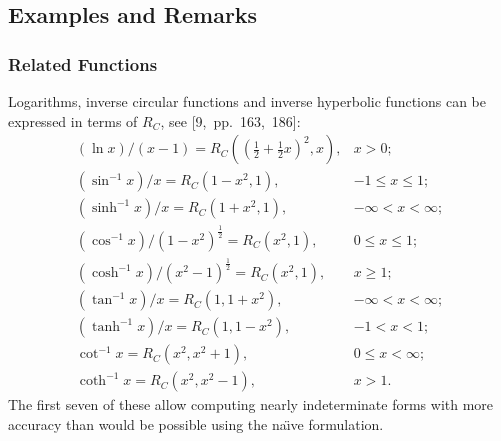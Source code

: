 \documentclass[twoside]{MATH77}
\begin{document}
\subsection{Examples and Remarks}

\subsubsection{Related Functions}

Logarithms, inverse circular functions and inverse hyperbolic functions can
be expressed in terms of $R_C$, see [9,~pp.~163,~186]:
$$
\begin{array}{ll}
(\ln x)/(x-1) = R_C((\frac{1}{2}+\frac{1}{2}x)^2,x), & x>0;\\
(\sin ^{-1} x)/x = R_C(1-x^2,1), & -1\leq x\leq 1;\\
(\sinh^{-1} x)/x = R_C(1+x^2,1),& -\infty <x<\infty;\\
(\cos ^{-1} x)/(1-x^2)^{\frac{1}{2}} = R_C(x^2,1), & 0\leq x\leq 1;\\
(\cosh ^{-1} x)/(x^2-1)^{\frac{1}{2}} = R_C(x^2,1), & x\geq 1;\\
(\tan ^{-1} x)/x = R_C(1,1+x^2), & -\infty <x<\infty ;\\
(\tanh ^{-1} x)/x = R_C(1,1-x^2), & -1<x<1;\\
\cot ^{-1} x = R_C(x^2,x^2+1), & 0\leq x<\infty;\\
\coth ^{-1} x = R_C(x^2,x^2-1), & x>1.
\end{array}
$$
The first seven of these allow computing nearly indeterminate forms
with more accuracy than would be possible using the na\"\i ve
formulation.
\end{document}
